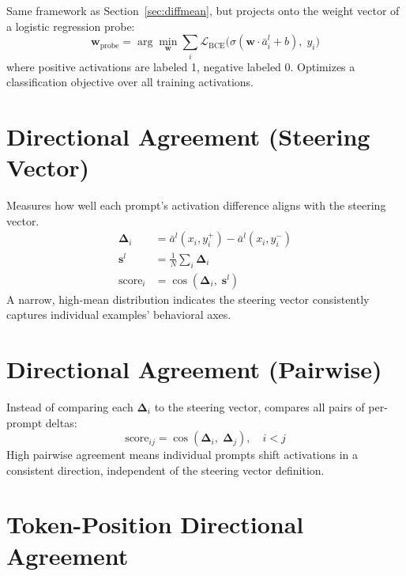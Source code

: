 \documentclass[11pt]{article}
\begin{document}
Same framework as Section~\ref{sec:diffmean}, but projects onto the weight vector of a logistic regression probe:
\begin{equation}
    \mathbf{w}_\text{probe} = \arg\min_{\mathbf{w}} \sum_i \mathcal{L}_\text{BCE}\!\bigl(\sigma(\mathbf{w} \cdot \bar{a}^l_i + b),\; y_i\bigr)
\end{equation}
where positive activations are labeled 1, negative labeled 0. Optimizes a classification objective over all training activations.

\section{Directional Agreement (Steering Vector)}
\label{sec:dir-agree}

Measures how well each prompt's activation difference aligns with the steering vector.
\begin{align}
    \boldsymbol{\Delta}_i &= \bar{a}^l(x_i, y_i^+) - \bar{a}^l(x_i, y_i^-) \\
    \mathbf{s}^l &= \frac{1}{N}\sum_i \boldsymbol{\Delta}_i \\
    \text{score}_i &= \cos(\boldsymbol{\Delta}_i,\; \mathbf{s}^l)
\end{align}
A narrow, high-mean distribution indicates the steering vector consistently captures individual examples' behavioral axes.

\section{Directional Agreement (Pairwise)}
\label{sec:pairwise}

Instead of comparing each $\boldsymbol{\Delta}_i$ to the steering vector, compares all pairs of per-prompt deltas:
\begin{equation}
    \text{score}_{ij} = \cos(\boldsymbol{\Delta}_i,\; \boldsymbol{\Delta}_j), \quad i < j
\end{equation}
High pairwise agreement means individual prompts shift activations in a consistent direction, independent of the steering vector definition.

\section{Token-Position Directional Agreement}
\label{sec:token-pos}
\end{document}
